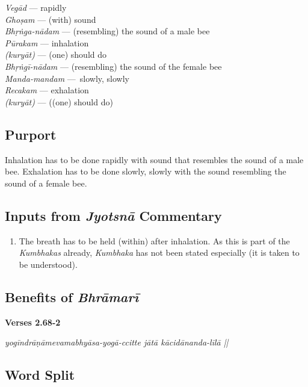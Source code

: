\begin{multicols}{2}
\textit{Vegād} --- rapidly\\
\textit{Ghoṣam} --- (with) sound \\
\textit{Bhṛṅga-nādam} --- (resembling) the sound of a male bee\\
\textit{Pūrakam} --- inhalation \\
\textit{(kuryāt)} --- (one) should do \\
\textit{Bhṛṅgī-nādam} --- (resembling) the sound of the female bee \\
\textit{Manda-mandam} --- slowly, slowly \\
\textit{Recakam} --- exhalation \\
\textit{(kuryāt)} --- ((one) should do)
\end{multicols}

\subsection*{Purport}
\vspace{-7pt}
Inhalation has to be done rapidly with sound that resembles the sound of a male bee. Exhalation has to be done slowly, slowly with the sound resembling the sound of a female bee.

\subsection*{Inputs from \textit{Jyotsnā} Commentary}


\begin{enumerate}
\item The breath has to be held (within) after inhalation. As this is part of the \textit{Kumbhakas} already, \textit{Kumbhaka} has not been stated especially (it is taken to be understood). 
\end{enumerate}

\subsection*{Benefits of \textit{Bhrāmarī}}

\noindent \textbf{Verses 2.68-2}

\begin{center}
\textit{yogīndrāṇāmevamabhyāsa-yogā-ccitte jātā kācidānanda-līlā ||}
\end{center}

\subsection*{Word Split}

